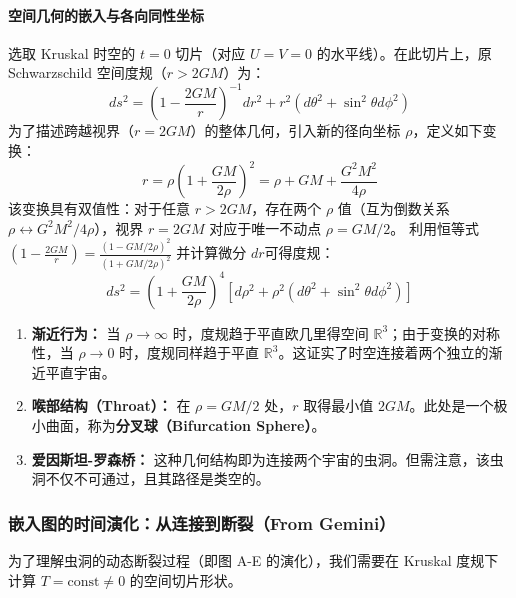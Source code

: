 \paragraph{空间几何的嵌入与各向同性坐标}
选取 Kruskal 时空的 $t=0$ 切片（对应 $U=V=0$ 的水平线）。在此切片上，原 Schwarzschild 空间度规（$r > 2GM$）为：
\begin{equation}
    ds^2 = \left(1 - \frac{2GM}{r}\right)^{-1} dr^2 + r^2 (d\theta^2 + \sin^2\theta d\phi^2) \label{eq:sch_spatial}
\end{equation}
为了描述跨越视界（$r=2GM$）的整体几何，引入新的径向坐标 $\rho$，定义如下变换：
\begin{equation}
    r = \rho \left(1 + \frac{GM}{2\rho}\right)^2 = \rho + GM + \frac{G^2M^2}{4\rho} \label{eq:iso_trans}
\end{equation}
该变换具有双值性：对于任意 $r > 2GM$，存在两个 $\rho$ 值（互为倒数关系 $\rho \leftrightarrow G^2M^2/4\rho$），视界 $r=2GM$ 对应于唯一不动点 $\rho = GM/2$。
利用恒等式 $\left(1-\frac{2GM}{r}\right) = \frac{(1-GM/2\rho)^2}{(1+GM/2\rho)^2}$ 并计算微分 $dr$可得度规：
\begin{equation}
    ds^2 = \left(1 + \frac{GM}{2\rho}\right)^4 \left[ d\rho^2 + \rho^2 (d\theta^2 + \sin^2\theta d\phi^2) \right]
\end{equation}
\begin{enumerate}
    \item \textbf{渐近行为：} 当 $\rho \to \infty$ 时，度规趋于平直欧几里得空间 $\mathbb{R}^3$；由于变换的对称性，当 $\rho \to 0$ 时，度规同样趋于平直 $\mathbb{R}^3$。这证实了时空连接着两个独立的渐近平直宇宙。
    \item \textbf{喉部结构（Throat）：} 在 $\rho = GM/2$ 处，$r$ 取得最小值 $2GM$。此处是一个极小曲面，称为\textbf{分叉球（Bifurcation Sphere）}。
    \item \textbf{爱因斯坦-罗森桥：} 这种几何结构即为连接两个宇宙的虫洞。但需注意，该虫洞不仅不可通过，且其路径是类空的。
\end{enumerate}

\subsubsection{嵌入图的时间演化：从连接到断裂（From Gemini）}

为了理解虫洞的动态断裂过程（即图 A-E 的演化），我们需要在 Kruskal 度规下计算 $T = \text{const} \neq 0$ 的空间切片形状。

